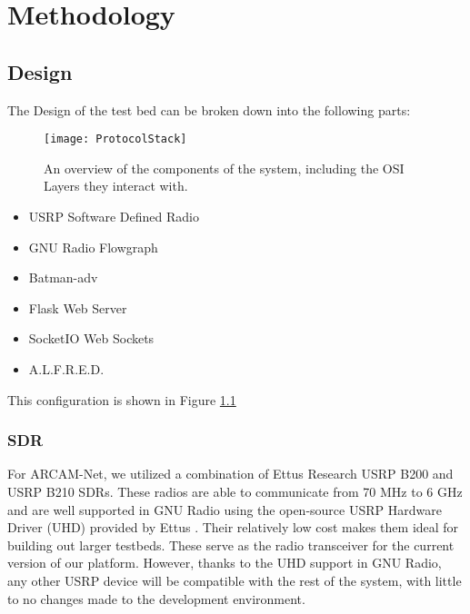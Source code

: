 
\chapter{Methodology} %

\label{Chapter3} %




\section{Design}

The Design of the test bed can be broken down into the following parts:

\begin{figure}
	\centering
	\texttt{[image: ProtocolStack]}
	\caption{An overview of the components of the system, including the OSI Layers they interact with. \cite{0003} \cite{0007} \cite{0008} \cite{0015} \cite{0012} \cite{0011}}
	\label{fig:ProtocolStack}
\end{figure}

\begin{itemize}
	\item USRP Software Defined Radio
	\item GNU Radio Flowgraph
	\item Batman-adv
	\item Flask Web Server
	\item SocketIO Web Sockets
	\item A.L.F.R.E.D. 
\end{itemize}

This configuration is shown in Figure \ref{fig:ProtocolStack}

\subsection{SDR}

For ARCAM-Net, we utilized a combination of Ettus Research USRP B200 and USRP B210 SDRs. These radios are able to communicate from 70 MHz to 6 GHz and are well supported in GNU Radio using the open-source USRP Hardware Driver (UHD) provided by Ettus \cite{0007}. Their relatively low cost makes them ideal for building out larger testbeds. These serve as the radio transceiver for the current version of our platform. However, thanks to the UHD support in GNU Radio, any other USRP device will be compatible with the rest of the system, with little to no changes made to the development environment. 

